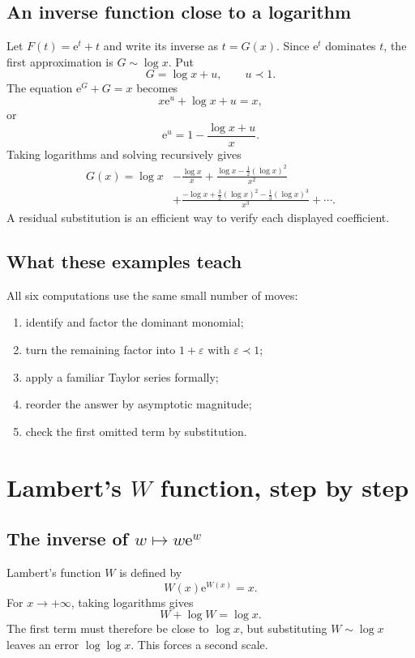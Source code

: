 \documentclass[11pt,openany]{book}
\theoremstyle{plain}
\theoremstyle{definition}
\theoremstyle{remark}
\newcommand{\e}{\mathrm{e}}
\begin{document}
\section{An inverse function close to a logarithm}
Let $F(t)=\e^t+t$ and write its inverse as $t=G(x)$. Since $\e^t$ dominates $t$, the first approximation is $G\sim\log x$. Put
\[
  G=\log x+u,
  \qquad u\prec1.
\]
The equation $\e^G+G=x$ becomes
\[
  x\e^u+\log x+u=x,
\]
or
\[
  \e^u=1-\frac{\log x+u}{x}.
\]
Taking logarithms and solving recursively gives
\begin{align*}
  G(x)=\log x
  &-\frac{\log x}{x}
  +\frac{\log x-\tfrac12(\log x)^2}{x^2}\\
  &+\frac{-\log x+\tfrac32(\log x)^2
    -\tfrac13(\log x)^3}{x^3}+\cdots.
\end{align*}
A residual substitution is an efficient way to verify each displayed coefficient.

\section{What these examples teach}
All six computations use the same small number of moves:
\begin{enumerate}
\item identify and factor the dominant monomial;
\item turn the remaining factor into $1+\varepsilon$ with $\varepsilon\prec1$;
\item apply a familiar Taylor series formally;
\item reorder the answer by asymptotic magnitude;
\item check the first omitted term by substitution.
\end{enumerate}

\chapter{Lambert's \texorpdfstring{$W$}{W} function, step by step}
\label{chap:lambertw}

\section{\texorpdfstring{The inverse of $w\mapsto w\e^w$}{The inverse of w mapped to w exp(w)}}
Lambert's function $W$ is defined by
\[
  W(x)\e^{W(x)}=x.
\]
For $x\to+\infty$, taking logarithms gives
\[
  W+\log W=\log x.
\]
The first term must therefore be close to $\log x$, but substituting $W\sim\log x$ leaves an error $\log\log x$. This forces a second scale.
\end{document}
